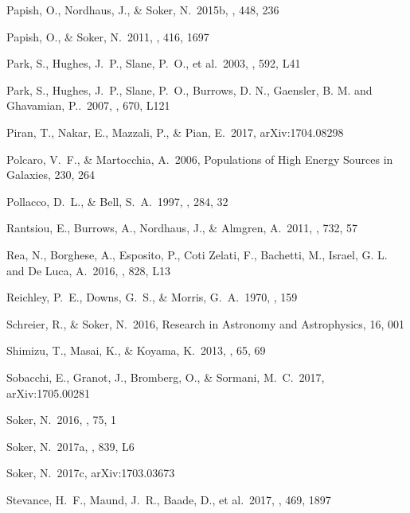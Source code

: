 \documentclass[12pt,preprint,a4paper]{aastex}
\begin{document}
\begin{thebibliography}
 Papish, O., Nordhaus, J., \& Soker, N.\ 2015b, \mnras, 448, 236

 Papish, O., \& Soker, N.\ 2011, \mnras, 416, 1697 

 Park, S., Hughes, J.~P., Slane, P.~O., et al.\ 2003, \apjl, 592, L41 

 Park, S., Hughes, J.~P., Slane, P.~O., Burrows, D. N., Gaensler, B. M. and Ghavamian, P..\ 2007, \apjl, 670, L121 

 Piran, T., Nakar, E., Mazzali, P., \& Pian, E.\ 2017, arXiv:1704.08298

 Polcaro, V.~F., \& Martocchia, A.\ 2006, Populations of High Energy Sources in Galaxies, 230, 264 

 Pollacco, D.~L., \& Bell, S.~A.\ 1997, \mnras, 284, 32 

 {Rantsiou, E., Burrows, A., Nordhaus, J., \& Almgren, A.\ 2011, \apj, 732, 57}

 Rea, N., Borghese, A., Esposito, P., Coti Zelati, F., Bachetti, M., Israel, G. L. and De Luca, A.\ 2016, \apjl, 828, L13 

 Reichley, P.~E., Downs, G.~S., \& Morris, G.~A.\ 1970, \apjl, 159 

 Schreier, R., \& Soker, N.\ 2016, Research in Astronomy and Astrophysics, 16, 001

 Shimizu, T., Masai, K., \& Koyama, K.\ 2013, \pasj, 65, 69

 Sobacchi, E., Granot, J., Bromberg, O., \& Sormani, M.~C.\ 2017, arXiv:1705.00281

 Soker, N.\ 2016, \nar, 75, 1

 Soker, N.\ 2017a, \apjl, 839, L6 

 Soker, N.\ 2017c, arXiv:1703.03673

 Stevance, H.~F., Maund, J.~R., Baade, D., et al.\ 2017, \mnras, 469, 1897 



\end{thebibliography}
\end{document}
